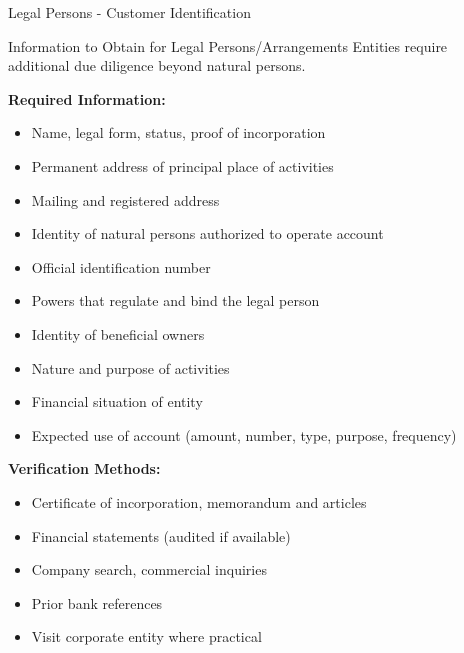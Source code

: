 \documentclass[11pt,a4paper]{beamer}
\begin{document}
	\begin{frame}{Legal Persons - Customer Identification}
		\begin{block}{Information to Obtain for Legal Persons/Arrangements}
			Entities require additional due diligence beyond natural persons.
		\end{block}
		\textbf{Required Information:}
		\begin{itemize}
			\item Name, legal form, status, proof of incorporation
			\item Permanent address of principal place of activities
			\item Mailing and registered address
			\item Identity of natural persons authorized to operate account
			\item Official identification number
			\item Powers that regulate and bind the legal person
			\item Identity of beneficial owners
			\item Nature and purpose of activities
			\item Financial situation of entity
			\item Expected use of account (amount, number, type, purpose, frequency)
		\end{itemize}
		\textbf{Verification Methods:}
		\begin{itemize}
			\item Certificate of incorporation, memorandum and articles
			\item Financial statements (audited if available)
			\item Company search, commercial inquiries
			\item Prior bank references
			\item Visit corporate entity where practical
		\end{itemize}
	\end{frame}
	
\end{document}
